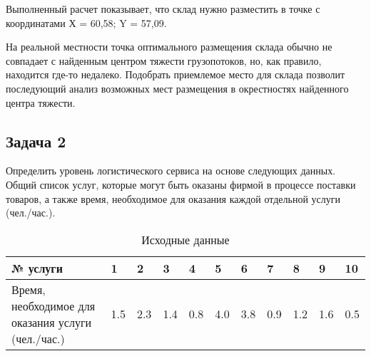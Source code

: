 Выполненный расчет показывает, что склад нужно разместить в точке с координатами Х = 60,58; Y = 57,09.

На реальной местности точка оптимального размещения склада обычно не совпадает с найденным центром тяжести грузопотоков, но, как правило, находится где-то недалеко.
Подобрать приемлемое место для склада позволит последующий анализ возможных мест размещения в окрестностях найденного центра тяжести.

\subsection{Задача 2}
Определить уровень логистического сервиса на основе следующих данных.
Общий список услуг, которые могут быть оказаны фирмой в процессе поставки товаров, а также время, необходимое для оказания каждой отдельной услуги (чел./час.).

\begin{table}[]
	\small
	\centering
	\caption{Исходные данные}
	\label{my-label}
	\setlength{\extrarowheight}{1mm}
	\begin{tabularx}{\textwidth}{|p{3.85cm}|K{1cm}|K{1cm}|K{1cm}|K{1cm}|K{1cm}|K{1cm}|K{1cm}|K{1cm}|K{1cm}|K{1cm}|}
		\hline
		№ услуги                                           & 1   & 2   & 3   & 4   & 5   & 6   & 7   & 8   & 9   & 10  \\ \hline
		Время, необходимое для оказания услуги (чел./час.) & 1.5 & 2.3 & 1.4 & 0.8 & 4.0 & 3.8 & 0.9 & 1.2 & 1.6 & 0.5 \\ \hline
	\end{tabularx}
\end{table}